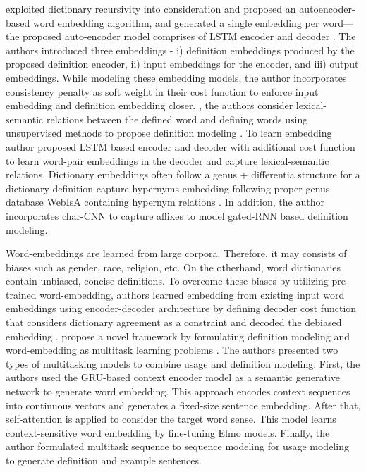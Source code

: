 \citeauthor*{bosc_auto_2018} exploited dictionary recursivity into consideration and proposed an autoencoder-based word embedding algorithm, and generated a single embedding per word—the proposed auto-encoder model comprises of LSTM encoder and decoder \cite{bosc_auto_2018}. The authors introduced three embeddings - i) definition embeddings produced by the proposed definition encoder, ii) input embeddings for the encoder, and iii) output embeddings. While modeling these embedding models, the author incorporates consistency penalty as soft weight in their cost function to enforce input embedding and definition embedding closer. \citeauthor*{washio_bridging_2019}, the authors consider lexical-semantic relations between the defined word and defining words using unsupervised methods to propose definition modeling \cite{washio_bridging_2019}. To learn embedding author proposed LSTM based encoder and decoder with additional cost function to learn word-pair embeddings in the decoder and capture lexical-semantic relations. Dictionary embeddings often follow a genus + differentia structure for a dictionary definition \citeauthor*{noraset_definition_2016} capture hypernyms embedding following proper genus database WebIsA containing hypernym relations \cite{noraset_definition_2016}. In addition, the author incorporates char-CNN to capture affixes to model gated-RNN based definition modeling.


Word-embeddings are learned from large corpora. Therefore, it may consists of biases such as gender, race, religion, etc. On the otherhand, word dictionaries contain unbiased, concise definitions. To overcome these biases by utilizing pre-trained word-embedding, authors learned embedding from existing input word embeddings using encoder-decoder architecture by defining decoder cost function that considers dictionary agreement as a constraint and decoded the debiased embedding \cite{kaneko_dictionary_2021}. \citeauthor*{zhang_improving_2020} propose a novel framework by formulating definition modeling and word-embedding as multitask learning problems \cite{zhang_improving_2020}. The authors presented two types of multitasking models to combine usage and definition modeling. First, the authors used the GRU-based context encoder model as a semantic generative network to generate word embedding. This approach encodes context sequences into continuous vectors and generates a fixed-size sentence embedding. After that, self-attention is applied to consider the target word sense. This model learns context-sensitive word embedding by fine-tuning Elmo models. Finally, the author formulated multitask sequence to sequence modeling for usage modeling to generate definition and example sentences.
